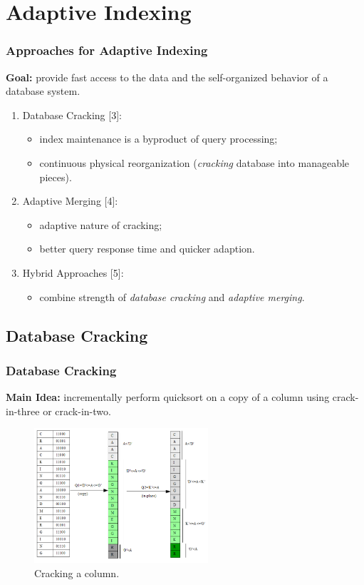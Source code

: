 \documentclass{beamer}
\begin{document}
\section{Adaptive Indexing}
\begin{frame}
\frametitle{Approaches for Adaptive Indexing}
\textbf{Goal:} provide fast access to the data and the self-organized behavior of a database system. \pause
\begin{enumerate}
\item{Database Cracking [3]:}
\begin{itemize}
\item{index maintenance is a byproduct of query processing;}
\item{continuous physical reorganization (\textit{cracking} database into manageable pieces).}
\end{itemize}
\pause
\item{Adaptive Merging [4]:}
\begin{itemize}
\item{adaptive nature of cracking;}
\item{better query response time and quicker adaption.}
\end{itemize}
\pause
\item{Hybrid Approaches [5]:}
\begin{itemize}
\item{combine strength of \emph{database cracking} and \emph{adaptive merging}.}
\end{itemize}
\end{enumerate}
\end{frame}

\subsection{Database Cracking}
\begin{frame}
\frametitle{Database Cracking}
\textbf{Main Idea: } incrementally perform quicksort on a copy of a column using crack-in-three or crack-in-two. \pause
\begin{figure}
\centering
\includegraphics[width=\linewidth, height=5cm, keepaspectratio]{graphics/cracking.png}
\caption{Cracking a column.}
\end{figure}
\end{frame}
\end{document}
